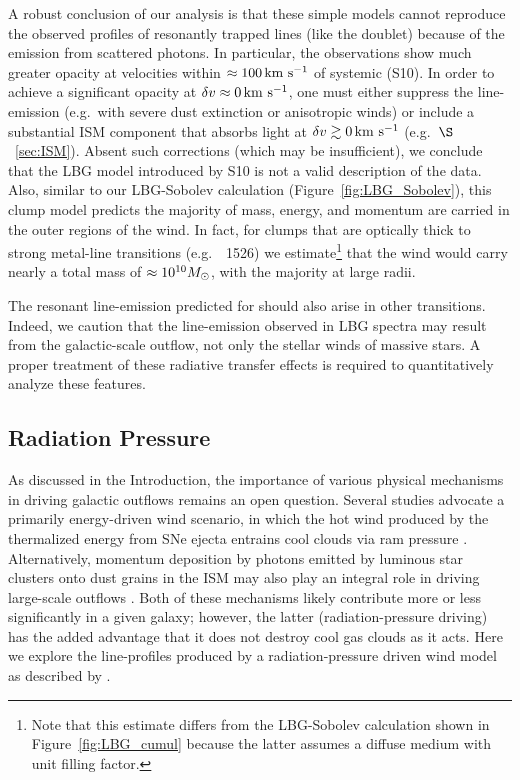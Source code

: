 \documentclass[]{emulateapj}
\begin{document}
A robust conclusion of our
analysis is that these simple models cannot reproduce the
observed profiles of resonantly trapped lines (like the 
doublet) because of the emission from scattered photons.  
In particular, the observations show much greater opacity at
velocities within $\approx 100 \, {\rm km~s^{-1}}$ of systemic (S10).
In order to
achieve a significant opacity at $\delta v \approx 0 \, {\rm km~s^{-1}}$, one must
either suppress the line-emission (e.g.\ with severe dust extinction
or anisotropic winds) 
or include a substantial ISM component that absorbs light at $\delta v
\gtrsim 0 \, {\rm km~s^{-1}}$ (e.g.\ $\S$~\ref{sec:ISM}).  
Absent such corrections (which may be insufficient),
we conclude that the LBG model
introduced by S10 is not a valid description of the data.  Also,
similar to our LBG-Sobolev calculation (Figure~\ref{fig:LBG_Sobolev}),
this clump model predicts the majority of mass, energy, and momentum are
carried in the outer regions of the wind. 
In fact, for clumps that are optically thick to strong metal-line
transitions (e.g.\ ~1526) we estimate\footnote{Note that
  this estimate differs from the LBG-Sobolev calculation shown in
  Figure~\ref{fig:LBG_cumul} because the latter assumes a diffuse
  medium with unit filling factor.}
that the wind would
carry nearly a total mass of $\approx 10^{10} M_\odot$, with the
majority at large radii.


The resonant line-emission predicted for  should also arise
in other transitions.  Indeed, we caution that the 
line-emission observed in LBG spectra
\citep[e.g.][]{prs+02} may result from the galactic-scale outflow, not
only the stellar winds of massive stars.
A proper treatment of these radiative transfer effects is required to
quantitatively analyze these features.

\subsection{Radiation Pressure}
\label{sec:radiative}

As discussed in the Introduction, the importance of various physical mechanisms
in driving galactic outflows remains an open
question.  Several studies advocate a primarily energy-driven
wind scenario, in which the hot wind produced by the thermalized
energy from SNe ejecta entrains cool clouds via ram pressure \citep[e.g.][]{cc85,ham90,sh09}.
Alternatively, momentum deposition by photons emitted by luminous star clusters onto
dust grains in the ISM may also play an integral role in driving
large-scale outflows \citep[e.g.][]{mqt05,mmt10}.  Both of these
mechanisms likely contribute more or less significantly in a given
galaxy; however, the latter (radiation-pressure driving) has the added
advantage that it does not destroy cool gas clouds as it acts.  Here
we explore the line-profiles produced by a radiation-pressure driven
wind model as described by \cite{mqt05}.
\end{document}
